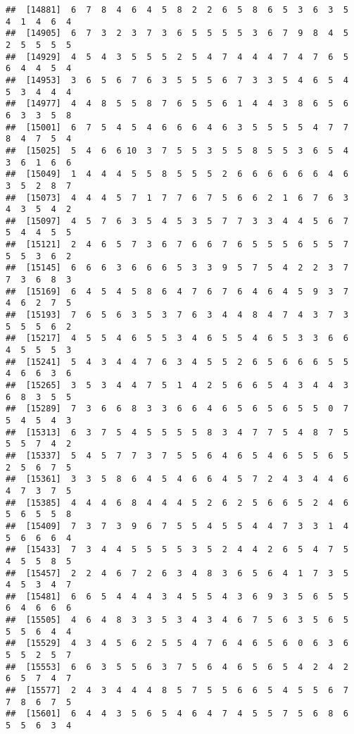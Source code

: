 \documentclass[
]{book}
\begin{document}
\begin{verbatim}
##  [14881]  6  7  8  4  6  4  5  8  2  2  6  5  8  6  5  3  6  3  5  4  1  4  6  4
##  [14905]  6  7  3  2  3  7  3  6  5  5  5  5  3  6  7  9  8  4  5  2  5  5  5  5
##  [14929]  4  5  4  3  5  5  5  2  5  4  7  4  4  4  7  4  7  6  5  6  4  4  5  4
##  [14953]  3  6  5  6  7  6  3  5  5  5  6  7  3  3  5  4  6  5  4  5  3  4  4  4
##  [14977]  4  4  8  5  5  8  7  6  5  5  6  1  4  4  3  8  6  5  6  6  3  3  5  8
##  [15001]  6  7  5  4  5  4  6  6  6  4  6  3  5  5  5  5  4  7  7  8  4  7  5  4
##  [15025]  5  4  6  6 10  3  7  5  5  3  5  5  8  5  5  3  6  5  4  3  6  1  6  6
##  [15049]  1  4  4  4  5  5  8  5  5  5  2  6  6  6  6  6  6  4  6  3  5  2  8  7
##  [15073]  4  4  4  5  7  1  7  7  6  7  5  6  6  2  1  6  7  6  3  4  3  5  4  2
##  [15097]  4  5  7  6  3  5  4  5  3  5  7  7  3  3  4  4  5  6  7  5  4  4  5  5
##  [15121]  2  4  6  5  7  3  6  7  6  6  7  6  5  5  5  6  5  5  7  5  5  3  6  2
##  [15145]  6  6  6  3  6  6  6  5  3  3  9  5  7  5  4  2  2  3  7  7  3  6  8  3
##  [15169]  6  4  5  4  5  8  6  4  7  6  7  6  4  6  4  5  9  3  7  4  6  2  7  5
##  [15193]  7  6  5  6  3  5  3  7  6  3  4  4  8  4  7  4  3  7  3  5  5  5  6  2
##  [15217]  4  5  5  4  6  5  5  3  4  6  5  5  4  6  5  3  3  6  6  4  5  5  5  3
##  [15241]  5  4  3  4  4  7  6  3  4  5  5  2  6  5  6  6  6  5  5  4  6  6  3  6
##  [15265]  3  5  3  4  4  7  5  1  4  2  5  6  6  5  4  3  4  4  3  6  8  3  5  5
##  [15289]  7  3  6  6  8  3  3  6  6  4  6  5  6  5  6  5  5  0  7  5  4  5  4  3
##  [15313]  6  3  7  5  4  5  5  5  5  8  3  4  7  7  5  4  8  7  5  5  5  7  4  2
##  [15337]  5  4  5  7  7  3  7  5  5  6  4  6  5  4  6  5  5  6  5  2  5  6  7  5
##  [15361]  3  3  5  8  6  4  5  4  6  6  4  5  7  2  4  3  4  4  6  4  7  3  7  5
##  [15385]  4  4  4  6  8  4  4  4  5  2  6  2  5  6  6  5  2  4  6  5  6  5  5  8
##  [15409]  7  3  7  3  9  6  7  5  5  4  5  5  4  4  7  3  3  1  4  5  6  6  6  4
##  [15433]  7  3  4  4  5  5  5  5  3  5  2  4  4  2  6  5  4  7  5  4  5  5  8  5
##  [15457]  2  2  4  6  7  2  6  3  4  8  3  6  5  6  4  1  7  3  5  4  5  3  4  7
##  [15481]  6  6  5  4  4  4  3  4  5  5  4  3  6  9  3  5  6  5  5  6  4  6  6  6
##  [15505]  4  6  4  8  3  3  5  3  4  3  4  6  7  5  6  3  5  6  5  5  5  6  4  4
##  [15529]  4  3  4  5  6  2  5  5  4  7  6  4  6  5  6  0  6  3  6  5  5  2  5  7
##  [15553]  6  6  3  5  5  6  3  7  5  6  4  6  5  6  5  4  2  4  2  6  5  7  4  7
##  [15577]  2  4  3  4  4  4  8  5  7  5  5  6  6  5  4  5  5  6  7  7  8  6  7  5
##  [15601]  6  4  4  3  5  6  5  4  6  4  7  4  5  5  7  5  6  8  6  5  5  6  3  4

\end{verbatim}
\end{document}

